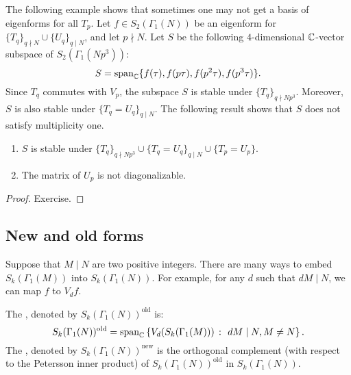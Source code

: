   The following example shows that sometimes one may not get a basis of eigenforms for all $T_p$. Let $f\in S_2(\Gamma_1(N))$ be an eigenform for $\{T_q\}_{q\nmid N}\cup\{U_q\}_{q\mid N}$, and let $p\nmid N$. Let $S$ be the following $4$-dimensional $\mathbb{C}$-vector subspace of $S_2(\Gamma_1(Np^3))$:
\[
S = \operatorname{span}_{\mathbb{C}} \{f(\tau),f(p\tau),f(p^2\tau),f(p^3\tau)\}.
\]
Since $T_q$ commutes with $V_p$, the subspace $S$ is stable under $\{T_q\}_{q\nmid Np^3}$. Moreover,
$S$ is also stable under $\{T_q=U_q\}_{q\mid N}$. The following result shows that $S$ does not satisfy multiplicity one.
\begin{proposition}
  \begin{enumerate}
  \item $S$ is stable under $\{T_q\}_{q\nmid Np^3} \cup \{T_q=U_q\}_{q \mid N}\cup \{T_p=U_p\}$.
  \item The matrix of $U_p$ is not diagonalizable.
  \end{enumerate}
\end{proposition}
\begin{proof}
  Exercise.
\end{proof}

\subsection{New and old forms}
\label{sec:newforms}

Suppose that $M\mid N$ are two positive integers. There are many ways to embed $S_k(\Gamma_1(M))$ into $S_k(\Gamma_1(N))$. For example, for any $d$ such that $dM\mid N$, we can map $f$ to $V_df$.

\begin{definition}
  The , denoted by $S_k(\Gamma_1(N))^\text{old}$ is:
\[
S_k(\Gamma_1(N))^\text{old} = \operatorname{span}_{\mathbb{C}} \left\{ V_d(S_k(\Gamma_1(M))) ~\colon~ dM\mid N, M\neq N\right\}.
\]
The , denoted by $S_k(\Gamma_1(N))^\text{new}$ is the orthogonal complement (with respect to the Petersson inner product) of $S_k(\Gamma_1(N))^\text{old}$ in $S_k(\Gamma_1(N))$.
\end{definition}

